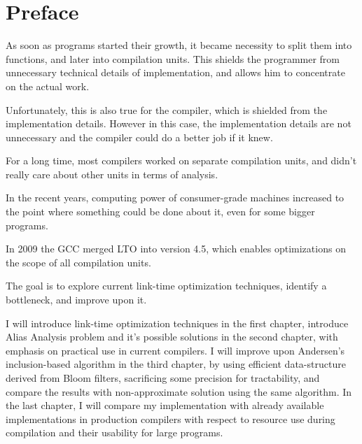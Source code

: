 \chapter*{Preface}

%
%
%
%

As soon as programs started their growth, it became necessity to split them into
functions, and later into compilation units. This shields the programmer from
unnecessary technical details of implementation, and allows him to concentrate on
the actual work.

Unfortunately, this is also true for the compiler, which is shielded from the
implementation details. However in this case, the implementation details are not
unnecessary and the compiler could do a better job if it knew.

For a long time, most compilers worked on separate compilation units, and didn't
really care about other units in terms of analysis.

In the recent years, computing power of consumer-grade machines increased to the
point where something could be done about it, even for some bigger programs.

In 2009 the GCC merged LTO into version 4.5, which enables optimizations on the
scope of all compilation units.

The goal is to explore current link-time optimization techniques, identify a
bottleneck, and improve upon it.




I will introduce link-time optimization techniques in the first chapter,
introduce Alias Analysis problem and it's possible solutions in the second
chapter, with emphasis on practical use in current compilers. I will improve
upon Andersen's inclusion-based algorithm in the third chapter, by using
efficient data-structure derived from Bloom filters, sacrificing some precision
for tractability, and compare the results with non-approximate solution using
the same algorithm. In the last chapter, I will compare my implementation with
already available implementations in production compilers with respect to
resource use during compilation and their usability for large programs.


